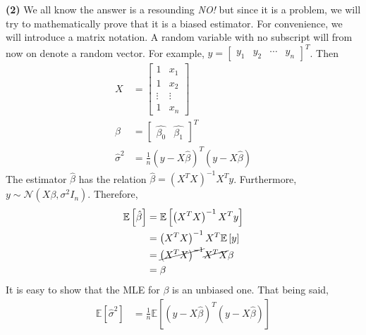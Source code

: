\documentclass[answers]{exam}
\begin{document}
\begin{questions}
\begin{solution}
      \textbf{(2)} We all know the answer is a resounding \emph{NO!} but since it is a problem, we will try to mathematically prove that it is a biased estimator. For convenience, we will introduce a matrix notation. A random variable with no subscript will from now on denote a random vector. For example, $y = \begin{bmatrix} y_{1} & y_{2} & \cdots & y_{n}\end{bmatrix}^{T}$. Then
      \begin{align*}
         X &= \begin{bmatrix} 1  & x_{1} \\ 1 & x_{2}\\ \vdots & \vdots \\ 1 & x_{n} \end{bmatrix}\\
         \hat{\beta} &= \begin{bmatrix} \hat{\beta_{0}} & \hat{\beta_{1}} \end{bmatrix}^{T}\\
         \widehat{\sigma}^{2} &= \frac{1}{n}\left(y-X\hat{\beta}\right)^{T}\left(y-X\hat{\beta}\right)
      \end{align*}
      The estimator $\hat{\beta}$ has the relation $\hat{\beta} = \left(X^{T}X\right)^{-1}X^{T}y$. Furthermore, $y \sim \mathcal{N}\left(X\beta, \sigma^{2}I_{n}\right)$. Therefore,
      \begin{align*}
         \mathbb{E}\left[\hat{\beta}\right] &= \mathbb{E}\left[\left(X^{T}X\right)^{-1}X^{T}y\right]\\
         &= \left(X^{T}X\right)^{-1}X^{T}\mathbb{E}\left[y\right]\\
         &= \cancel{\left(X^{T}X\right)^{-1}}\cancel{X^{T}X}\beta\\
         &= \beta
      \end{align*}
      It is easy to show that the MLE for $\beta$ is an unbiased one. That being said,
      \begin{align*}
         \mathbb{E}\left[\widehat{\sigma}^{2} \right] &= \frac{1}{n}\mathbb{E}\left[\left(y-X\hat{\beta}\right)^{T}\left(y-X\hat{\beta}\right)\right]
      \end{align*}
   \end{solution}
\end{questions}
\end{document}

